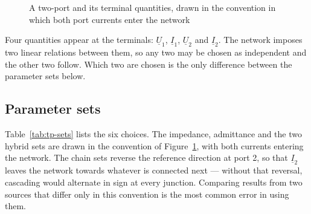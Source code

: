 \begin{figure}[!ht]
  \centering
  \caption{A two-port and its terminal quantities, drawn in the convention
           in which both port currents enter the network}
  \label{fig:tp-generic}
\end{figure}

Four quantities appear at the terminals: $\underline{U}_1$,
$\underline{I}_1$, $\underline{U}_2$ and $\underline{I}_2$. The network
imposes two linear relations between them, so any two may be chosen as
independent and the other two follow. Which two are chosen is the only
difference between the parameter sets below.

\subsection{Parameter sets}
\label{sec:tp-parameters}

Table~\ref{tab:tp-sets} lists the six choices. The impedance, admittance and
the two hybrid sets are drawn in the convention of
Figure~\ref{fig:tp-generic}, with both currents entering the network. The
chain sets reverse the reference direction at port 2, so that
$\underline{I}_2$ leaves the network towards whatever is connected next ---
without that reversal, cascading would alternate in sign at every junction.
Comparing results from two sources that differ only in this convention is
the most common error in using them.

